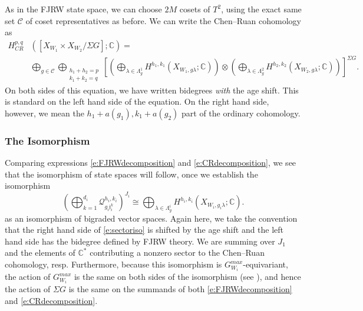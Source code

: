 \documentclass[10pt, letterpaper]{amsart}
\theoremstyle{remark}
\newcommand{\CC}{\mathbb C}
\newcommand{\cC}{\mathcal{C}}
\newcommand{\sQ}{\mathscr{Q}}
\newcommand{\jw}{\mathfrak{j}}
\newcommand{\s}[1]{\Sigma #1}
\begin{document}


As in the FJRW state space, we can choose $2M$ cosets of $T^2$, using the exact same set $\cC$ of coset representatives as before. We can write the Chen--Ruan cohomology as 
\begin{align}
H_{CR}^{p,q}&([X_{W_1}\times X_{W_2}/\s{G}];\CC)=\nonumber\\
	&\bigoplus_{g\in \cC}\bigoplus_{\substack{h_1+h_2=p\\k_1+k_2=q}}\left[\left(\bigoplus_{\lambda\in \Lambda^1_{g}}H^{h_1,k_1}(X_{W_1,g\lambda};\CC)\right)\otimes\left(\bigoplus_{\lambda\in \Lambda^2_{g}}H^{h_2,k_2}(X_{W_2,g\lambda};\CC)\right)\right]^{\s{G}}.\label{e:CRdecomposition}
\end{align} 
On both sides of this equation, we have written bidegrees \emph{with} the age shift. This is standard on the left hand side of the equation. On the right hand side, however, we mean the $h_1+a(g_1),k_1+a(g_2)$ part of the ordinary cohomology. 




\subsubsection{The Isomorphism}


Comparing expressions \eqref{e:FJRWdecomposition} and \eqref{e:CRdecomposition}, we see that the isomorphism of state spaces will follow, once we establish the isomorphism
\begin{equation}\label{e:sectoriso}
\left(\bigoplus_{k=1}^{d_i}\sQ_{g_i\jw_i^k}^{h_i,k_i}\right)^{J_i}
\cong \bigoplus_{\lambda\in \Lambda^i_{g}}H^{h_i,k_i}(X_{W_i,g_i\lambda};\CC).
\end{equation}
as an isomorphism of bigraded vector spaces. Again here, we take the convention that the right hand side of \eqref{e:sectoriso} is shifted by the age shift and the left hand side has the bidegree defined by FJRW theory. We are summing over $J_1$ and the elements of $\CC^*$ contributing a nonzero sector to the Chen--Ruan cohomology, resp.  %
Furthermore, because this isomorphism is $G_{W_i}^{max}$-equivariant, the action of $G_{W_i}^{max}$ is the same on both sides of the isomorphism (see \cite{ChR}), and hence the action of $\s{G}$ is the same on the summands of both \eqref{e:FJRWdecomposition} and \eqref{e:CRdecomposition}. 
\end{document}
